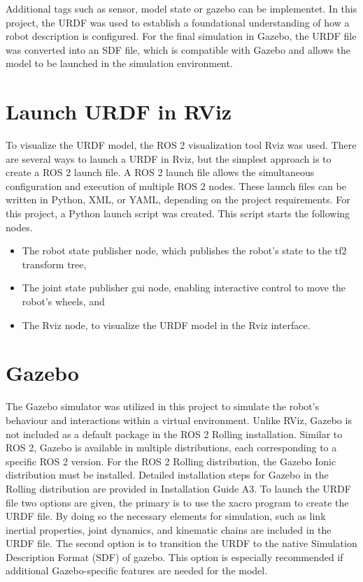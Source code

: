 Additional tags such as sensor, model state or gazebo can be implementet. In this project, the URDF was used to establish a foundational understanding of how a robot description is configured. For the final simulation in Gazebo, the URDF file was converted into an SDF file, which is compatible with Gazebo and allows the model to be launched in the simulation environment.

\section{Launch URDF in RViz}
To visualize the URDF model, the ROS 2 visualization tool Rviz was used. There are several ways to launch a URDF in Rviz, but the simplest approach is to create a ROS 2 launch file. A ROS 2 launch file allows the simultaneous configuration and execution of multiple ROS 2 nodes. These launch files can be written in Python, XML, or YAML, depending on the project requirements. \autocite{CreatingLaunchFile}
For this project, a Python launch script was created. This script starts the following nodes.

\begin{itemize}
    \item The robot state publisher node, which publishes the robot's state to the tf2 transform tree,
    \item The joint state publisher gui node, enabling interactive control to move the robot's wheels, and
    \item The Rviz node, to visualize the URDF model in the Rviz interface.
\end{itemize}



\section{Gazebo}
The Gazebo simulator was utilized in this project to simulate the robot's behaviour and interactions within a virtual environment. Unlike RViz, Gazebo is not included as a default package in the ROS 2 Rolling installation. Similar to ROS 2, Gazebo is available in multiple distributions, each corresponding to a specific ROS 2 version. For the ROS 2 Rolling distribution, the Gazebo Ionic distribution must be installed. Detailed installation steps for Gazebo in the Rolling distribution are provided in Installation Guide A3. To launch the URDF file two options are given, the primary is to use the xacro program to create the URDF file. By doing so the necessary elements for simulation, such as link inertial properties, joint dynamics, and kinematic chains are included in the URDF file. The second option is to transition the URDF to the native Simulation Description Format (SDF) of gazebo. This option is especially recommended if additional Gazebo-specific features are needed for the model.

